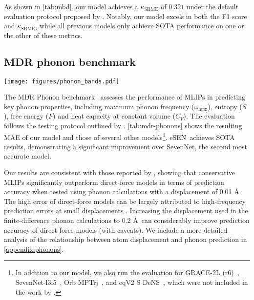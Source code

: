 \documentclass[twocolumn]{fairmeta}
\newcommand{\ourmodel}{eSEN}
\begin{document}
As shown in \cref{tab:mbd}, our model achieves a $\kappa_{\mathrm{SRME}}$ of $0.321$ under the default evaluation protocol proposed by \citealt{pota2024thermal}. Notably, our model excels in both the F1 score and $\kappa_{\mathrm{SRME}}$, while all previous models only achieve SOTA performance on one or the other of these metrics. 


\subsection{MDR phonon benchmark}

\begin{figure*}[t]
\texttt{[image: figures/phonon\_bands.pdf]}
\caption{
Predicted phonon band structure and density of states (DOS) of Si (diamond structure), CsCl (CsCl structure), AlN (wurtzite structure) using \ourmodel~at different displacement values. DFT baseline is taken from the PBE MDR dataset \cite{loew2024universal} calculated using a displacement of 0.01 \AA.}
\label{fig:phonon_bands}
\end{figure*}

The MDR Phonon benchmark~\citep{loew2024universal} assesses the performance of MLIPs in predicting key phonon properties, including maximum phonon frequency ($\omega_{\text{max}}$), entropy ($S$), free energy ($F$) and heat capacity at constant volume ($C_V$). The evaluation follows the testing protocol outlined by \citealt{loew2024universal}. \cref{tab:mdr-phonons} shows the resulting MAE of our model and those of several other models\footnote{In addition to our model, we also run the evaluation for GRACE-2L (r6)~\citep{bochkarev2024graph}, SevenNet-l3i5~\citep{park2024scalable}, Orb MPTrj~\citep{neumann2024orb}, and eqV2 S DeNS~\citep{liao2023equiformerv2, barroso2024open}, which were not included in the work by \citealt{loew2024universal}.}. \ourmodel\ achieves SOTA results, demonstrating a significant improvement over SevenNet, the second most accurate model.

Our results are consistent with those reported by \citealt{loew2024universal}, showing that conservative MLIPs significantly outperform direct-force models in terms of prediction accuracy when tested using phonon calculations with a displacement of 0.01 \AA. The high error of direct-force models can be largely attributed to high-frequency prediction errors at small displacements \cite{loew2024universal}. Increasing the displacement used in the finite-difference phonon calculations to 0.2 \AA\ can considerably improve prediction accuracy of direct-force models (with caveats). We include a more detailed analysis of the relationship between atom displacement and phonon prediction in \cref{appendix:phonons}.
\end{document}
